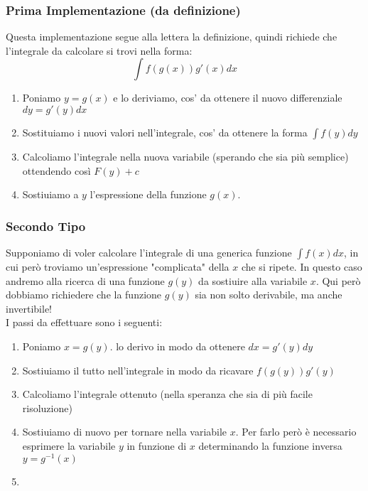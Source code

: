 \subsubsection*{Prima Implementazione (da definizione)}
Questa implementazione segue alla lettera la definizione, quindi richiede che l'integrale da calcolare si trovi nella forma:
$$\int f(g(x)) g'(x) dx$$
\begin{enumerate}
	\item Poniamo $y=g(x)$ e lo deriviamo, cos' da ottenere il nuovo differenziale $dy = g'(y)dx$
	\item Sostituiamo i nuovi valori nell'integrale, cos' da ottenere la forma $\int f(y) dy$
	\item Calcoliamo l'integrale nella nuova variabile (sperando che sia più semplice) ottendendo così $F(y) + c$
	\item Sostiuiamo a $y$ l'espressione della funzione $g(x)$.
\end{enumerate}

\subsubsection*{Secondo Tipo}
Supponiamo di voler calcolare l'integrale di una generica funzione $\int f(x)dx$, in cui però troviamo un'espressione "complicata" della $x$ che si ripete.
In questo caso andremo alla ricerca di una funzione $g(y)$ da sostiuire alla variabile $x$.
Qui però dobbiamo richiedere che la funzione $g(y)$ sia non solto derivabile, ma anche invertibile!
\\I passi da effettuare sono i seguenti:
\begin{enumerate}
	\item Poniamo $x=g(y)$. lo derivo in modo da ottenere $dx=g'(y)dy$
	\item Sostiuiamo il tutto nell'integrale in modo da ricavare $f(g(y))g'(y)$
	\item Calcoliamo l'integrale ottenuto (nella speranza che sia di più facile risoluzione)
	\item Sostiuiamo di nuovo per tornare nella variabile $x$. Per farlo però è necessario esprimere la variabile $y$ in funzione di $x$ determinando la funzione inversa $y=g^{-1}(x)$
	\item 
\end{enumerate}
